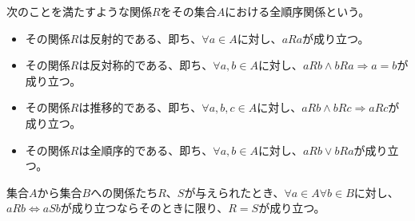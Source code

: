 \documentclass[dvipdfmx]{jsarticle}
\begin{document}
\begin{axs}
次のことを満たすような関係$R$をその集合$A$における全順序関係という。
\begin{itemize}
\item
  その関係$R$は反射的である、即ち、$\forall a \in A$に対し、$aRa$が成り立つ。
\item
  その関係$R$は反対称的である、即ち、$\forall a,b \in A$に対し、$aRb \land bRa \Rightarrow a = b$が成り立つ。
\item
  その関係$R$は推移的である、即ち、$\forall a,b,c \in A$に対し、$aRb \land bRc \Rightarrow aRc$が成り立つ。
\item
  その関係$R$は全順序的である、即ち、$\forall a,b \in A$に対し、$aRb \vee bRa$が成り立つ。
\end{itemize}
\end{axs}
\begin{thm}\label{1.2.5.6}
集合$A$から集合$B$への関係たち$R$、$S$が与えられたとき、$\forall a \in A\forall b \in B$に対し、$aRb \Leftrightarrow aSb$が成り立つならそのときに限り、$R = S$が成り立つ。
\end{thm}
\end{document}
